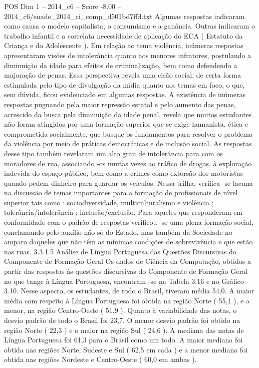 \begin{textsample}{POS Dim 1 – 2014\_c6 – Score -8.00 – 2014\_c6/enade\_2014\_ci\_comp\_d501bd7ffd.txt}
Algumas respostas indicaram como causa o modelo capitalista, o consumismo e a ganância.
Outras indicaram o trabalho infantil e a correlata necessidade de aplicação do ECA ( Estatuto da Criança e do Adolescente ).
Em relação ao tema violência, inúmeras respostas apresentaram visões de intolerância quanto aos menores infratores, postulando a diminuição da idade para efeitos de criminalização, bem como defendendo a majoração de penas.
Essa perspectiva revela uma cisão social, de certa forma estimulada pelo tipo de divulgação da mídia quanto aos temas em foco, o que, sem dúvida, ficou evidenciado em algumas respostas.
A existência de inúmeras respostas pugnando pela maior repressão estatal e pelo aumento das penas, acrescido da busca pela diminuição da idade penal, revela que muitos estudantes não foram atingidos por uma formação superior que se exige humanista, ética e comprometida socialmente, que busque os fundamentos para resolver o problema da violência por meio de práticas democráticas e de inclusão social.
As respostas desse tipo também revelaram um alto grau de intolerância para com os moradores de rua, associando -os muitas vezes ao tráfico de drogas, à exploração indevida do espaço público, bem como a crimes como extorsão dos motoristas quando pedem dinheiro para guardar os veículos.
Nessa trilha, verifica -se lacuna na discussão de temas importantes para a formação de profissionais de nível superior tais como : sociodiversidade, multiculturalismo e violência ; tolerância/intolerância ; inclusão/exclusão.
Para aqueles que responderam em conformidade com o padrão de respostas verificou -se uma plena formação social, conclamando pelo auxílio não só do Estado, mas também da Sociedade no amparo daqueles que não têm as mínimas condições de sobrevivência e que estão nas ruas. 3.3.1.5 Análise de Língua Portuguesa das Questões Discursivas do Componente de Formação Geral Os dados de Ciência da Computação, obtidos a partir das respostas às questões discursivas do Componente de Formação Geral no que tange à Língua Portuguesa, encontram -se na Tabela 3.16 e no Gráfico 3.10.
Nesse aspecto, os estudantes, de todo o Brasil, tiveram média 54,0.
A maior média com respeito à Língua Portuguesa foi obtida na região Norte ( 55,1 ), e a menor, na região Centro-Oeste ( 51,9 ).
Quanto à variabilidade das notas, o desvio padrão de todo o Brasil foi 23,7.
O menor desvio padrão foi obtido na região Norte ( 22,3 ) e o maior na região Sul ( 24,6 ).
A mediana das notas de Língua Portuguesa foi 61,3 para o Brasil como um todo.
A maior mediana foi obtida nas regiões Norte, Sudeste e Sul ( 62,5 em cada ) e a menor mediana foi obtida nas regiões Nordeste e Centro-Oeste ( 60,0 em ambas ).

\end{textsample}
